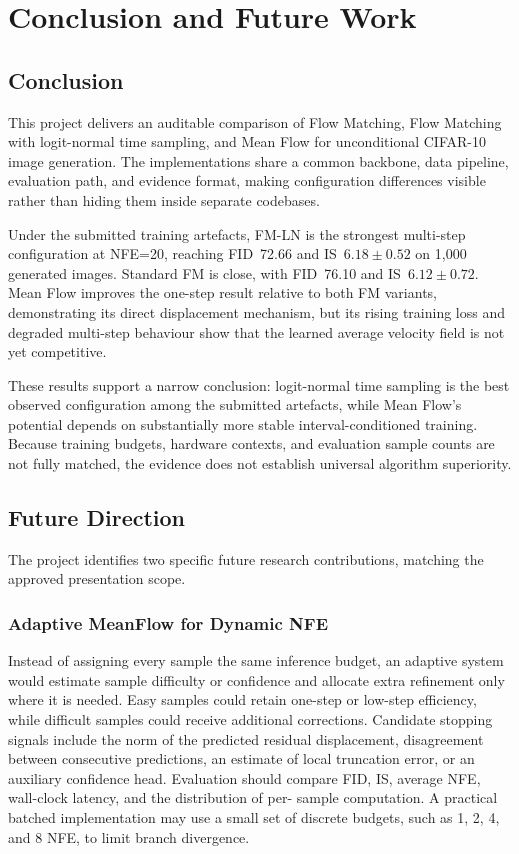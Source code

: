 \chapter{Conclusion and Future Work}

\section{Conclusion}

This project delivers an auditable comparison of Flow Matching, Flow Matching
with logit-normal time sampling, and Mean Flow for unconditional CIFAR-10 image
generation. The implementations share a common backbone, data pipeline,
evaluation path, and evidence format, making configuration differences visible
rather than hiding them inside separate codebases.

Under the submitted training artefacts, FM-LN is the strongest multi-step
configuration at NFE=20, reaching FID~72.66 and IS~$6.18\!\pm\!0.52$ on
1{,}000 generated images. Standard FM is close, with FID~76.10 and
IS~$6.12\!\pm\!0.72$. Mean Flow improves the one-step result relative to both
FM variants, demonstrating its direct displacement mechanism, but its rising
training loss and degraded multi-step behaviour show that the learned average
velocity field is not yet competitive.

These results support a narrow conclusion: logit-normal time sampling is the
best observed configuration among the submitted artefacts, while Mean Flow's
potential depends on substantially more stable interval-conditioned training.
Because training budgets, hardware contexts, and evaluation sample counts are
not fully matched, the evidence does not establish universal algorithm
superiority.

\section{Future Direction}

The project identifies two specific future research contributions, matching the
approved presentation scope.

\subsection{Adaptive MeanFlow for Dynamic NFE}

Instead of assigning every sample the same inference budget, an adaptive system
would estimate sample difficulty or confidence and allocate extra refinement
only where it is needed. Easy samples could retain one-step or low-step
efficiency, while difficult samples could receive additional corrections.
Candidate stopping signals include the norm of the predicted residual
displacement, disagreement between consecutive predictions, an estimate of
local truncation error, or an auxiliary confidence head. Evaluation should
compare FID, IS, average NFE, wall-clock latency, and the distribution of per-
sample computation. A practical batched implementation may use a small set of
discrete budgets, such as 1, 2, 4, and 8 NFE, to limit branch divergence.


